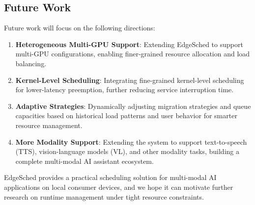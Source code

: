 \subsection{Future Work}

Future work will focus on the following directions:

\begin{enumerate}
\item \textbf{Heterogeneous Multi-GPU Support}: Extending EdgeSched to support multi-GPU configurations, enabling finer-grained resource allocation and load balancing.

\item \textbf{Kernel-Level Scheduling}: Integrating fine-grained kernel-level scheduling for lower-latency preemption, further reducing service interruption time.

\item \textbf{Adaptive Strategies}: Dynamically adjusting migration strategies and queue capacities based on historical load patterns and user behavior for smarter resource management.

\item \textbf{More Modality Support}: Extending the system to support text-to-speech (TTS), vision-language models (VL), and other modality tasks, building a complete multi-modal AI assistant ecosystem.
\end{enumerate}

EdgeSched provides a practical scheduling solution for multi-modal AI applications on local consumer devices, and we hope it can motivate further research on runtime management under tight resource constraints.
